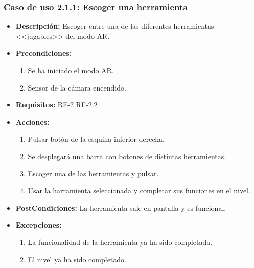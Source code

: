 \subsubsection{Caso de uso 2.1.1: Escoger una herramienta}
\begin{itemize}
	\item \textbf{Descripción:} Escoger entre una de las diferentes herramientas <<jugables>> del modo AR.
	\item \textbf{Precondiciones:}
	\begin{enumerate}
		\item Se ha iniciado el modo AR.
		\item Sensor de la cámara encendido.
	\end{enumerate}
	\item \textbf{Requisitos:} RF-2 RF-2.2
	\item \textbf{Acciones:} 
	\begin{enumerate}
		\item Pulsar  botón de la esquina inferior derecha.
		\item Se desplegará una barra con botones de distintas herramientas.
		\item Escoger una de las herramientas y pulsar.
		\item Usar la harramienta seleccionada y completar sus funciones en el nivel.
	\end{enumerate}
	\item \textbf{PostCondiciones:} La herramienta sale en pantalla y es funcional.
	\item \textbf{Excepciones:} 
	\begin{enumerate}
		\item La funcionalidad de la herramienta ya ha sido completada.
		\item El nivel ya ha sido completado.
	\end{enumerate}

\end{itemize}

